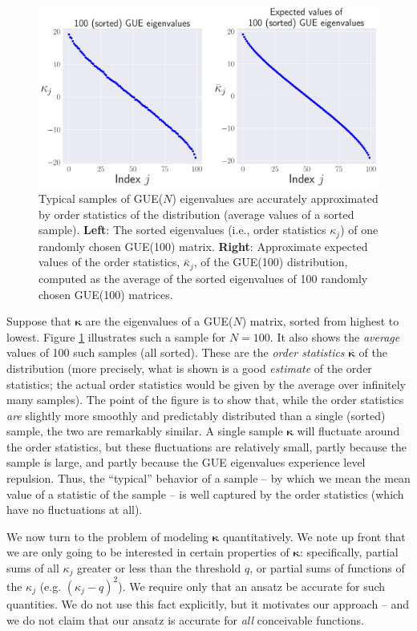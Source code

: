 \documentclass[aps,pra, twocolumn]{revtex4-1}
\newcommand{\bvec}[1]{\boldsymbol{#1}}
\begin{document}
\begin{figure}[h!]
\includegraphics[width=\columnwidth]{Images/Figure_4.pdf}
\caption{Typical samples of GUE($N$) eigenvalues are accurately approximated by order statistics of the distribution (average values of a sorted sample).  \textbf{Left}:  The sorted eigenvalues (i.e., order statistics $\kappa_{j}$) of one randomly chosen GUE(100) matrix.  \textbf{Right}:  Approximate expected values of the order statistics, $\bar{\kappa}_{j}$, of the GUE(100) distribution, computed as the average of the sorted eigenvalues of 100 randomly chosen GUE(100) matrices.}
\label{fig:orderstatistics1}
\end{figure}

Suppose that $\bvec{\kappa}$ are the eigenvalues of a GUE($N$) matrix, sorted from highest to lowest.  Figure \ref{fig:orderstatistics1} illustrates such a sample for $N=100$.  It also shows the \emph{average} values of 100 such samples (all sorted).  These are the \emph{order statistics} $\overline{\bvec{\kappa}}$ of the distribution (more precisely, what is shown is a good \emph{estimate} of the order statistics; the actual order statistics would be given by the average over infinitely many samples).  The point of the figure is to show that, while the order statistics \emph{are} slightly more smoothly and predictably distributed than a single (sorted) sample, the two are remarkably similar.  A single sample $\bvec{\kappa}$ will fluctuate around the order statistics, but these fluctuations are relatively small, partly because the sample is large, and partly because the GUE eigenvalues experience level repulsion.  Thus, the ``typical'' behavior of a sample -- by which we mean the mean value of a statistic of the sample -- is well captured by the order statistics (which have no fluctuations at all).

We now turn to the problem of modeling $\bvec{\kappa}$ quantitatively.  We note up front that we are only going to be interested in certain properties of $\bvec{\kappa}$:  specifically, partial sums of all $\kappa_j$ greater or less than the threshold $q$, or partial sums of functions of the $\kappa_j$ (e.g. $(\kappa_j-q)^2$).  We require only that an ansatz be accurate for such quantities.  We do not use this fact explicitly, but it motivates our approach -- and we do not claim that our ansatz is accurate for \emph{all} conceivable functions.
\end{document}

